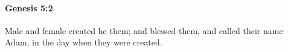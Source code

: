 
		\paragraph{Genesis 5:2} %
			\label{GENESIS-5-2}

			Male and female created he them; and blessed them, and called their name Adam, in the day when they were created.


